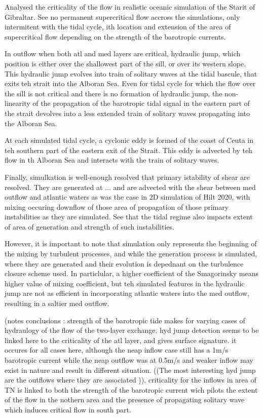 Analysed the criticality of the flow in realistic oceanic simulation of the Starit of Gibraltar. See no permanent supercritical flow accross the simulations, only intermitent with the tidal cycle, ith location and extension of the area of supercritical flow depending on the strength of the barotropic currents.

In outflow when both atl and med layers are critical, hydraulic jump, which position is either over the shallowest part of the sill, or over its western slope. This hydraulic jump evolves into train of solitary waves at the tidal bascule, that exits teh strait into the Alboran Sea. Even for tidal cycle for which the flow over the sill is not critical and there is no formation of hydraulic jump, the non-linearity of the propagation of the barotropic tidal signal in the eastern part of the strait devolves into a less extended train of solitary waves propagating into the Alboran Sea.

At each simulated tidal cycle, a cyclonic eddy is formed of the coast of Ceuta in teh southern part of the eastern exit of the Strait. This eddy is advected by teh flow in th Alboran Sea and interacts with the train of solitary waves.

Finally, simulkation is well-enough resolved that primary istability of shear are resolved. They are generated at ... and are advected with the shear between med outflow and atlantic waters as was the case in 2D simulation of Hilt 2020, with mixing occuring downflow of those area of propagation of those primary instabilities as they are simulated. See that the tidal regime also impacts extent of area of generation and strength of such instabilities. 

However, it is important to note that simulation only represents the beginning of the mixing by turbulent processes, and while the generation process is simulated, where they are generated and their evolution is depednant on the turbulence closure scheme used. In particlular, a higher coefficient of the Smagorinsky means higher value of mixing coefficient, but teh simulated features in the hydraulic jump are not as efficient in incorporating atlantic waters into the med outflow, resulting in a saltier med outflow.








(notes conclusions : strength of the barotropic tide makes for varying cases of hydraulogy of the flow of the two-layer exchange. hyd jump detection seems to be linked here to the criticality of the atl layer, and gives surface signature. it occures for all cases here, although the neap inflow case still has a 1m/s barotropic current while the neap outflow was at 0.5m/s and weaker inflow may exist in nature and result in different situation. ((The most interesting hyd jump are the outflows where they are associated  )). criticality for the inflows in area of TN is linked to both the strength of the barotropic current wich pilots the extent of the flow in the nothern area and the presence of propagating solitary wave which induces critical flow in south part.

